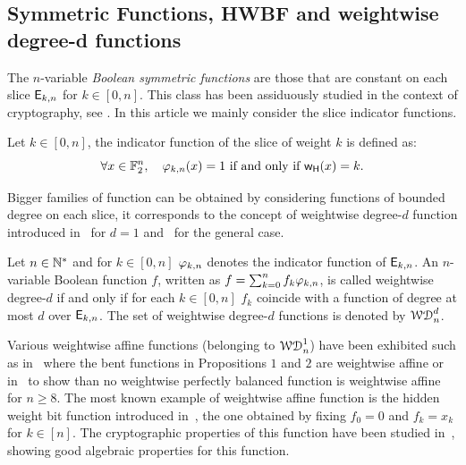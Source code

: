 \documentclass[11pt]{llncs}
\begin{document}
\subsection{Symmetric Functions, HWBF and weightwise degree-d functions}




The $n$-variable \emph{Boolean symmetric functions} are those that are constant on each slice $\mathsf{E}_{k,n}$ for $k\in [0,n]$. 
This class has been assiduously studied in the context of cryptography, see \eg \cite{IEEE:Carlet04,IEEE:CanVid05,INDO:BraPre05,DM:SarMai07,IEEE:QFLW09,IEEE:CheLu11,Latin:Meaux19,CCDS:Meaux21,IEEE:CarMea21}.
In this article we mainly consider the slice indicator functions.
\begin{definition}\label{def:slice}
 Let $k\in [0,n]$, the indicator function of the slice of weight $k$ is defined as:
 \[\forall  x\in \mathbb{F}_2^{n}, \quad \varphi_{k,n}(x) = 1 \text{ if and only if } \mathsf{w_H}(x) = k.\]
\end{definition}

Bigger families of function can be obtained by considering functions of bounded degree on each slice, it corresponds to the concept of weightwise degree-$d$ function introduced in~\cite{DAM:GinMea22} for $d=1$ and~\cite{DAM:MeaOza24} for the general case. 

\begin{definition}\label{def:wwdegd}
	Let $n\in \mathbb{N}^*$ and for $k\in[0,n]$ $\varphi_{k,n}$ denotes the indicator function of $\mathsf{E}_{k,n}$. 
	An $n$-variable Boolean function $f$, written as $f=\sum_{k=0}^n f_k \varphi_{k,n}$, is called weightwise degree-$d$ if and only if for each $k\in [0,n]$ $f_k$ coincide with a function of degree at most $d$ over $\mathsf{E}_{k,n}$. 
		The set of weightwise degree-$d$ functions is denoted by $\mathcal{WD}^{d}_{n}$.
\end{definition}



Various weightwise affine functions (\ie belonging to $\mathcal{WD}^{1}_{n}$) have been exhibited such as in~\cite{TOSC:CarMeaRot17} where the bent functions in Propositions $1$ and $2$ are weightwise affine or in~\cite{DAM:GinMea22} to show than no weightwise perfectly balanced function is weightwise affine for $n\ge 8$. 
The most known example of weightwise affine function is the hidden weight bit function introduced in~\cite{IEEE:Bryant91}, the one obtained by fixing $f_0=0$ and $f_k=x_k$ for $k \in [n]$. The cryptographic properties of this function have been studied in~\cite{DAM:WCST14}, showing good algebraic properties for this function.
\end{document}
